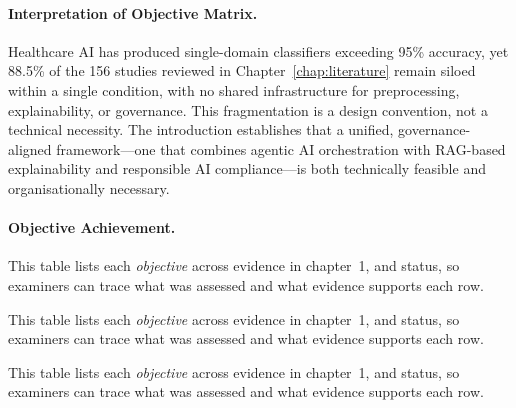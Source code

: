 \iffalse %
\paragraph{Interpretation of Objective Matrix.}
Healthcare AI has produced single-domain classifiers exceeding 95\% accuracy, yet 88.5\% of the 156 studies reviewed in Chapter~\ref{chap:literature} remain siloed within a single condition, with no shared infrastructure for preprocessing, explainability, or governance. This fragmentation is a design convention, not a technical necessity. The introduction establishes that a unified, governance-aligned framework---one that combines agentic AI orchestration with RAG-based explainability and responsible AI compliance---is both technically feasible and organisationally necessary.

\paragraph{Objective Achievement.}

\noindent This table lists each \textit{objective} across evidence in chapter~1, and status, so examiners can trace what was assessed and what evidence supports each row.



\noindent This table lists each \textit{objective} across evidence in chapter~1, and status, so examiners can trace what was assessed and what evidence supports each row.


\noindent This table lists each \textit{objective} across evidence in chapter~1, and status, so examiners can trace what was assessed and what evidence supports each row.



